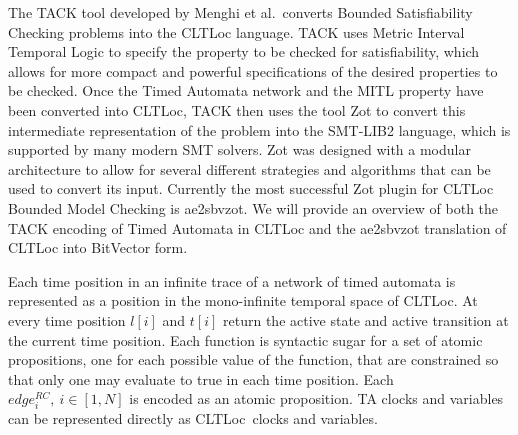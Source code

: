 \documentclass[a4paper,11pt]{report}
\theoremstyle{definition}
\newcommand{\cltloc}{CLTLoc}
\newcommand{\aez}{ae2sbvzot}
\begin{document}
The TACK\cite{tack20} tool developed by Menghi et al.\ converts Bounded
Satisfiability Checking problems into the CLTLoc language. TACK uses Metric
Interval Temporal Logic to specify the property to be checked for satisfiability,
which allows for more compact and powerful specifications of the desired
properties to be checked. Once the Timed Automata network and the MITL property
have been converted into CLTLoc, TACK then uses the tool Zot to convert this
intermediate representation of the problem into the SMT-LIB2 language, which is
supported by many modern SMT solvers. Zot was designed with a modular
architecture to allow for several different strategies and algorithms that can
be used to convert its input. Currently the most successful Zot plugin for
CLTLoc Bounded Model Checking is \aez. We will provide an overview of both
the TACK encoding of Timed Automata in CLTLoc and the ae2sbvzot translation of
CLTLoc into BitVector form.


Each time position in an infinite trace of a network of timed automata is
represented as a position in the mono-infinite temporal space of \cltloc. At
every time position $l[i]$ and $t[i]$ return the active state and active
transition at the current time position. Each function is syntactic sugar for a
set of atomic propositions, one for each possible value of the function, that
are constrained so that only one may evaluate to true in each time position.
Each $edge_{i}^{RC},\ i \in [1,N]$ is encoded as an atomic proposition. TA
clocks and variables can be represented directly as \cltloc\ clocks and
variables.
\end{document}
